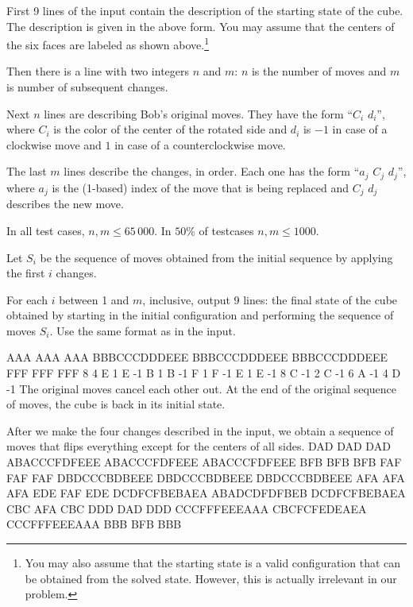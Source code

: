
First 9 lines of the input contain the description of
the starting state of the cube. The description is given
in the above form. You may assume that the centers of the
six faces are labeled as shown above.\footnote{You may also assume
that the starting state is a valid configuration that can be obtained
from the solved state. However, this is actually irrelevant in our problem.}

Then there is a line with two integers $n$ and $m$:
$n$ is the number of moves and $m$ is number of subsequent changes.

Next $n$ lines are describing Bob's original moves.
They have the form ``$C_i$ $d_i$'',
where $C_i$ is the color of the center of the rotated side
and $d_i$ is $-1$ in case of a clockwise move
and $1$ in case of a counterclockwise move.

The last $m$ lines describe the changes, in order.
Each one has the form ``$a_j$ $C_j$ $d_j$'',
where $a_j$ is the (1-based) index of the move that
is being replaced and $C_j$ $d_j$ describes the
new move.


In all test cases, $n,m \leq 65\,000$. In $50\%$ of testcases $n,m \leq 1000$.

\newpage


Let $S_i$ be the sequence of moves obtained from the initial sequence
by applying the first $i$ changes.

For each $i$ between 1 and $m$, inclusive, output 9 lines: the final state
of the cube obtained by starting in the initial configuration and performing
the sequence of moves $S_i$. Use the same format as in the input.


\sampleIN
AAA
AAA
AAA
BBBCCCDDDEEE
BBBCCCDDDEEE
BBBCCCDDDEEE
FFF
FFF
FFF
8 4
E 1
E -1
B 1
B -1
F 1
F -1
E 1
E -1
8 C -1
2 C -1
6 A -1
4 D -1
\sampleCOMMENT
The original moves cancel each other out.
At the end of the original sequence of moves,
the cube is back in its initial state.

After we make the four changes described in the input,
we obtain a sequence of moves that flips everything
except for the centers of all sides.
\sampleOUT
DAD
DAD
DAD
ABACCCFDFEEE
ABACCCFDFEEE
ABACCCFDFEEE
BFB
BFB
BFB
FAF
FAF
FAF
DBDCCCBDBEEE
DBDCCCBDBEEE
DBDCCCBDBEEE
AFA
AFA
AFA
EDE
FAF
EDE
DCDFCFBEBAEA
ABADCDFDFBEB
DCDFCFBEBAEA
CBC
AFA
CBC
DDD
DAD
DDD
CCCFFFEEEAAA
CBCFCFEDEAEA
CCCFFFEEEAAA
BBB
BFB
BBB
\sampleEND



